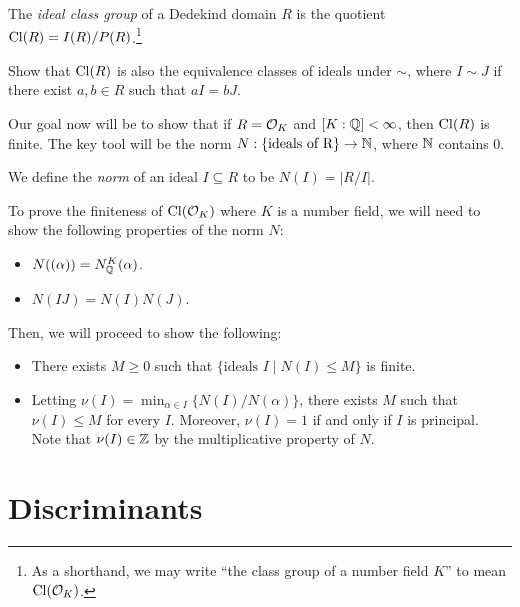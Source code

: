 \begin{definition}
  The \emph{ideal class group} of a Dedekind domain $R$
  is 
  the quotient $\operatorname{Cl}(R) = I(R) / P(R)$.\footnote{As a shorthand, we may write ``the class group of
  a number field $K$'' to mean $\operatorname{Cl}(\mathcal{O}_K)$.}
\end{definition}

\begin{exercise}
  Show that $\operatorname{Cl}(R)$ is also the equivalence classes
  of ideals under $\sim$, where $I \sim J$ if
  there exist $a, b \in R$ such that $aI = bJ$.
\end{exercise}


\begin{remark}
  Our goal now will be to show that if $R = \mathcal{O}_K$
  and $[K : \mathbb{Q}] < \infty$, then $\operatorname{Cl}(R)$ is finite.
  The key tool will be the norm
  $N : \{\text{ideals of R}\} \to \mathbb{N}$, where
  $\mathbb{N}$ contains $0$.
\end{remark}

\begin{definition}
  We define the \emph{norm} of an ideal $I \subseteq R$
  to be $N(I) = |R/I|$.
\end{definition}

\begin{remark}
  To prove the finiteness of $\operatorname{Cl}(\mathcal{O}_K)$ where
  $K$ is a number field,
  we will need to show the following properties of the
  norm $N$:
  \begin{itemize}
    \item $N((\alpha)) = N^{K}_{\mathbb{Q}}(\alpha)$.
    \item $N(IJ) = N(I) N(J)$.
  \end{itemize}
  Then, we will proceed to show the following:
  \begin{itemize}
    \item There exists $M \ge 0$ such that
      $\{\text{ideals } I \mid N(I) \le M\}$ is finite.
    \item Letting $\nu(I) = \min_{\alpha \in I} \{N(I) / N(\alpha)\}$,
      there exists $M$ such that
      $\nu(I) \le M$ for every $I$.
      Moreover, $\nu(I) = 1$ if and only if
      $I$ is principal.
      Note that
      $\nu(I) \in \mathbb{Z}$ by the multiplicative property
      of $N$.
  \end{itemize}
\end{remark}

\section{Discriminants}

